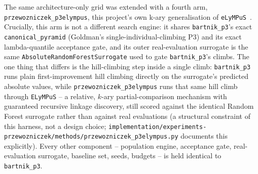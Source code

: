 %

The same architecture-only grid was extended with a fourth arm, \texttt{przewozniczek\_p3elympus}, this project's own k-ary generalisation of \texttt{eLyMPuS}~\citep{przewozniczek2026lympus}. Crucially, this arm is not a different search engine: it shares \texttt{bartnik\_p3}'s exact \texttt{canonical\_pyramid} (Goldman's single-individual-climbing P3) and its exact lambda-quantile acceptance gate, and its outer real-evaluation surrogate is the same \texttt{AbsoluteRandomForestSurrogate} used to gate \texttt{bartnik\_p3}'s climbs. The one thing that differs is the hill-climbing step inside a single climb: \texttt{bartnik\_p3} runs plain first-improvement hill climbing directly on the surrogate's predicted absolute values, while \texttt{przewozniczek\_p3elympus} runs that same hill climb through \texttt{ELyMPuS} -- a relative, $k$-ary partial-comparison mechanism with guaranteed recursive linkage discovery, still scored against the identical Random Forest surrogate rather than against real evaluations (a structural constraint of this harness, not a design choice; \texttt{implementation/experiments-przewozniczek/methods/przewozniczek\_p3elympus.py} documents this explicitly). Every other component -- population engine, acceptance gate, real-evaluation surrogate, baseline set, seeds, budgets -- is held identical to \texttt{bartnik\_p3}.

